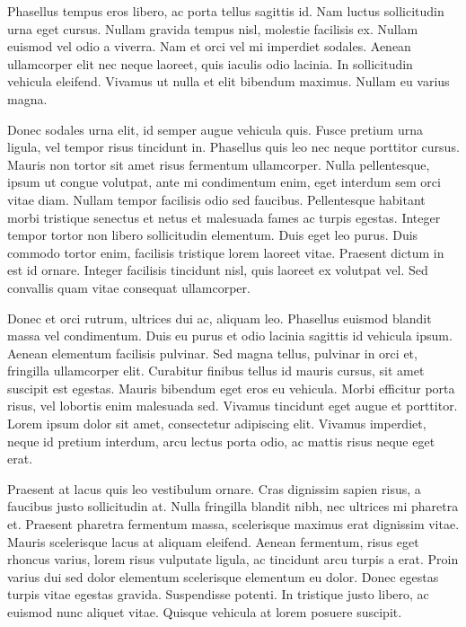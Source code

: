 \documentclass{book}
\begin{document}
            Phasellus tempus eros libero, ac porta tellus sagittis id. Nam luctus sollicitudin
               urna eget cursus. Nullam gravida tempus nisl, molestie facilisis ex. Nullam euismod
               vel odio a viverra. Nam et orci vel mi imperdiet sodales. Aenean ullamcorper elit nec
               neque laoreet, quis iaculis odio lacinia. In sollicitudin vehicula eleifend. Vivamus
               ut nulla et elit bibendum maximus. Nullam eu varius magna.
            
            Donec sodales urna elit, id semper augue vehicula quis. Fusce pretium urna ligula,
               vel tempor risus tincidunt in. Phasellus quis leo nec neque porttitor cursus. Mauris
               non tortor sit amet risus fermentum ullamcorper. Nulla pellentesque, ipsum ut congue
               volutpat, ante mi condimentum enim, eget interdum sem orci vitae diam. Nullam tempor
               facilisis odio sed faucibus. Pellentesque habitant morbi tristique senectus et netus
               et malesuada fames ac turpis egestas. Integer tempor tortor non libero sollicitudin
               elementum. Duis eget leo purus. Duis commodo tortor enim, facilisis tristique lorem
               laoreet vitae. Praesent dictum in est id ornare. Integer facilisis tincidunt nisl,
               quis laoreet ex volutpat vel. Sed convallis quam vitae consequat ullamcorper.
            
            Donec et orci rutrum, ultrices dui ac, aliquam leo. Phasellus euismod blandit massa
               vel condimentum. Duis eu purus et odio lacinia sagittis id vehicula ipsum. Aenean
               elementum facilisis pulvinar. Sed magna tellus, pulvinar in orci et, fringilla
               ullamcorper elit. Curabitur finibus tellus id mauris cursus, sit amet suscipit est
               egestas. Mauris bibendum eget eros eu vehicula. Morbi efficitur porta risus, vel
               lobortis enim malesuada sed. Vivamus tincidunt eget augue et porttitor. Lorem ipsum
               dolor sit amet, consectetur adipiscing elit. Vivamus imperdiet, neque id pretium
               interdum, arcu lectus porta odio, ac mattis risus neque eget erat.
            
            Praesent at lacus quis leo vestibulum ornare. Cras dignissim sapien risus, a faucibus
               justo sollicitudin at. Nulla fringilla blandit nibh, nec ultrices mi pharetra et.
               Praesent pharetra fermentum massa, scelerisque maximus erat dignissim vitae. Mauris
               scelerisque lacus at aliquam eleifend. Aenean fermentum, risus eget rhoncus varius,
               lorem risus vulputate ligula, ac tincidunt arcu turpis a erat. Proin varius dui sed
               dolor elementum scelerisque elementum eu dolor. Donec egestas turpis vitae egestas
               gravida. Suspendisse potenti. In tristique justo libero, ac euismod nunc aliquet
               vitae. Quisque vehicula at lorem posuere suscipit.
            
\end{document}
